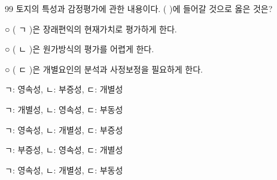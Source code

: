\begin{question}{99}
토지의 특성과 감정평가에 관한 내용이다. ( )에 들어갈 것으로 옳은 것은?
\begin{framedtext}
○ ( ㄱ )은 장래편익의 현재가치로 평가하게 한다. \par
○ ( ㄴ )은 원가방식의 평가를 어렵게 한다. \par
○ ( ㄷ )은 개별요인의 분석과 사정보정을 필요하게 한다. \par
\end{framedtext}
\begin{choices}
  \item ㄱ: 영속성, ㄴ: 부증성, ㄷ: 개별성
  \item ㄱ: 개별성, ㄴ: 영속성, ㄷ: 부동성
  \item ㄱ: 영속성, ㄴ: 개별성, ㄷ: 부증성
  \item ㄱ: 부증성, ㄴ: 영속성, ㄷ: 개별성
  \item ㄱ: 영속성, ㄴ: 개별성, ㄷ: 부동성
\end{choices}
\end{question}
